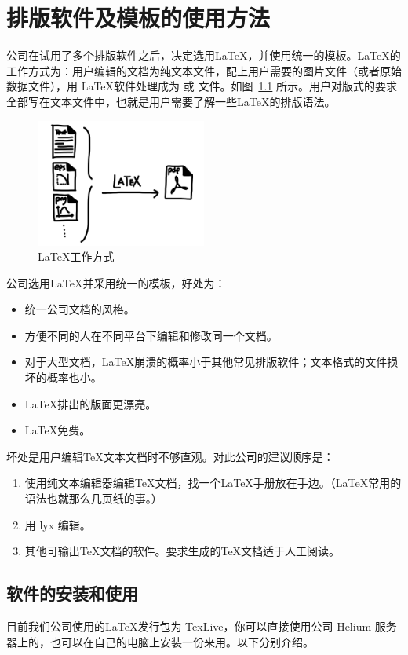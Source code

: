 \chapter{排版软件及模板的使用方法}
公司在试用了多个排版软件之后，决定选用\LaTeX ，并使用统一的模板。\LaTeX 的工作方式为：用户编辑的文档为纯文本文件，配上用户需要的图片文件（或者原始数据文件），用 \LaTeX 软件处理成为  或  文件。如图~\ref{latex} 所示。用户对版式的要求全部写在文本文件中，也就是用户需要了解一些\LaTeX 的排版语法。

\begin{figure}[htbp]\centering
\includegraphics[width=0.5\textwidth]{latex_wm.jpg} 
\caption{\label{latex}\LaTeX 工作方式}
\end{figure}

公司选用\LaTeX 并采用统一的模板，好处为：
\begin{itemize}
\item 统一公司文档的风格。
\item 方便不同的人在不同平台下编辑和修改同一个文档。
\item 对于大型文档，\LaTeX 崩溃的概率小于其他常见排版软件；文本格式的文件损坏的概率也小。
\item \LaTeX 排出的版面更漂亮。
\item \LaTeX 免费。
\end{itemize}
坏处是用户编辑\TeX 文本文档时不够直观。对此公司的建议顺序是：
\begin{enumerate}
\item 使用纯文本编辑器编辑\TeX 文档，找一个\LaTeX 手册放在手边。（\LaTeX 常用的语法也就那么几页纸的事\cite{oetiker1995not}。）
\item 用 lyx 编辑。
\item 其他可输出\TeX 文档的软件。要求生成的\TeX 文档适于人工阅读。
\end{enumerate}

\section{软件的安装和使用}
目前我们公司使用的\LaTeX 发行包为 TexLive，你可以直接使用公司 Helium 服务器上的，也可以在自己的电脑上安装一份来用。以下分别介绍。

